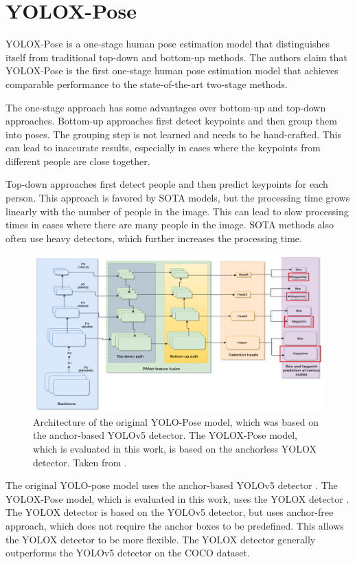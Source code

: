 \section{YOLOX-Pose}
YOLOX-Pose  is a one-stage human pose estimation model that distinguishes itself from traditional top-down and bottom-up methods. The authors claim that YOLOX-Pose is the first one-stage human pose estimation model that achieves comparable performance to the state-of-the-art two-stage methods.

The one-stage approach has some advantages over bottom-up and top-down approaches. Bottom-up approaches first detect keypoints and then group them into poses. The grouping step is not learned and needs to be hand-crafted. This can lead to inaccurate results, especially in cases where the keypoints from different people are close together.

Top-down approaches first detect people and then predict keypoints for each person. This approach is favored by SOTA models, but the processing time grows linearly with the number of people in the image. This can lead to slow processing times in cases where there are many people in the image. SOTA methods also often use heavy detectors, which further increases the processing time.

\begin{figure}[htbp]
    \centering
    \includegraphics[width=\textwidth]{obrazky-figures/yolopose_architecture.png}
    \caption{Architecture of the original YOLO-Pose model, which was based on the anchor-based YOLOv5 detector. The YOLOX-Pose model, which is evaluated in this work, is based on the anchorless YOLOX detector. Taken from \cite{yoloPose}.}
    \label{fig:yolopose_architecture}
\end{figure}

The original YOLO-pose \cite{yoloPose} model uses the anchor-based YOLOv5 detector \cite{yolov5}. The YOLOX-Pose model, which is evaluated in this work, uses the YOLOX detector \cite{yolox}. The YOLOX detector is based on the YOLOv5 detector, but uses anchor-free approach, which does not require the anchor boxes to be predefined. This allows the YOLOX detector to be more flexible. The YOLOX detector generally outperforms the YOLOv5 detector on the COCO dataset.
